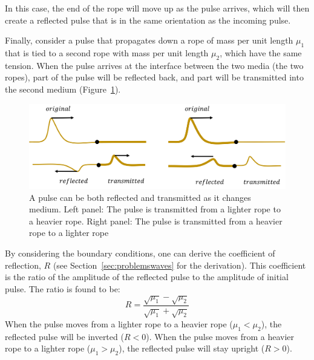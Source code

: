 In this case, the end of the rope will move up as the pulse arrives, which will then create a reflected pulse that is in the same orientation as the incoming pulse.

Finally, consider a pulse that propagates down a rope of mass per unit length $\mu_1$ that is tied to a second rope with mass per unit length $\mu_2$, which have the same tension. When the pulse arrives at the interface between the two media (the two ropes), part of the pulse will be reflected back, and part will be transmitted into the second medium (Figure~\ref{fig:waves:transmission}).

\begin{figure}[!htbp]
\centering
\includegraphics[width=0.8\linewidth]{files/transmission-21e5709e7a17f00aa0a9ec4a22f01bb3.png}
\caption[]{A pulse can be both reflected and transmitted as it changes medium. Left panel: The pulse is transmitted from a lighter rope to a heavier rope. Right panel: The pulse is transmitted from a heavier rope to a lighter rope}
\label{fig:waves:transmission}
\end{figure}

By considering the boundary conditions, one can derive the coefficient of reflection, $R$ (see Section~\ref{sec:problemswaves} for the derivation). This coefficient is the ratio of the amplitude of the reflected pulse to the amplitude of initial pulse. The ratio is found to be:
\begin{equation}
R=\frac{\sqrt{\mu_1}-\sqrt{\mu_2}}{\sqrt{\mu_1}+\sqrt{\mu_2}}
\end{equation}
When the pulse moves from a lighter rope to a heavier rope ($\mu_1<\mu_2$), the reflected pulse will be inverted ($R<0$). When the pulse moves from a heavier rope to a lighter rope ($\mu_1>\mu_2$), the reflected pulse will stay upright ($R>0$).

